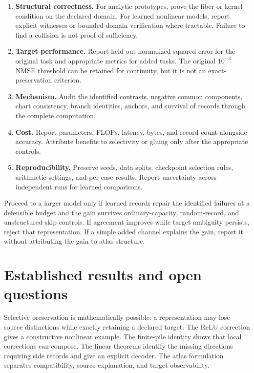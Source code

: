 \begin{enumerate}
\item \textbf{Structural correctness.} For analytic prototypes, prove the
fiber or kernel condition on the declared domain. For learned nonlinear
models, report explicit witnesses or bounded-domain verification where
tractable. Failure to find a collision is not proof of sufficiency.
\item \textbf{Target performance.} Report held-out normalized squared error
for the original task and appropriate metrics for added tasks. The original
\(10^{-3}\) NMSE threshold can be retained for continuity, but it is not an
exact-preservation criterion.
\item \textbf{Mechanism.} Audit the identified contrasts, negative common
components, chart consistency, branch identities, anchors, and survival of
records through the complete computation.
\item \textbf{Cost.} Report parameters, FLOPs, latency, bytes, and record
count alongside accuracy. Attribute benefits to selectivity or gluing only
after the appropriate controls.
\item \textbf{Reproducibility.} Preserve seeds, data splits, checkpoint
selection rules, arithmetic settings, and per-case results. Report
uncertainty across independent runs for learned comparisons.
\end{enumerate}

Proceed to a larger model only if learned records repair the identified
failures at a defensible budget and the gain survives ordinary-capacity,
random-record, and unstructured-skip controls. If agreement improves while
target ambiguity persists, reject that representation. If a simple added
channel explains the gain, report it without attributing the gain to atlas
structure.

\section{Established results and open questions}

Selective preservation is mathematically possible: a representation may lose
source distinctions while exactly retaining a declared target. The ReLU
correction gives a constructive nonlinear example. The finite-pile identity
shows that local corrections can compose. The linear theorems identify the
missing directions requiring side records and give an explicit decoder.
The atlas formulation separates compatibility, source explanation, and target
observability.

